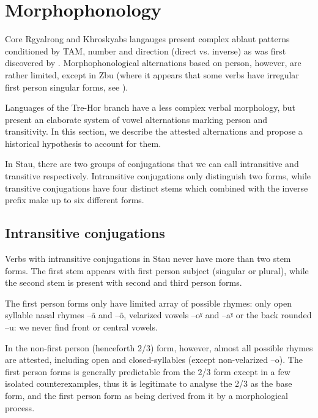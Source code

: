 \documentclass[oldfontcommands,oneside,a4paper,11pt]{article}
\newcommand{\ipa}[1]{{\phon #1}} %
\begin{document}
\section{Morphophonology}
Core Rgyalrong  and Khroskyabs langauges present complex ablaut patterns conditioned by TAM, number and direction (direct vs. inverse) as was first discovered by  \citet{jackson00sidaba}.  Morphophonological alternations based on person, however, are rather limited, except in Zbu (where it appears that some verbs have irregular first person singular forms, see \citealt{gongxun12}).

Languages of the Tre-Hor branch  have a less complex verbal morphology, but present an elaborate system of vowel alternations marking person and transitivity. In this section, we describe the attested alternations and propose a historical hypothesis to account for them.

In Stau, there are two groups of conjugations that we can call intransitive and transitive respectively. Intransitive conjugations only distinguish two forms, while transitive conjugations have four distinct stems which combined with the inverse prefix make up to six different forms.

\subsection{Intransitive conjugations}
Verbs with intransitive conjugations in Stau never have more than two stem forms. The first stem appears with first person subject (singular or plural), while the second stem is present with second and third person forms.

The first person forms only have limited array of possible rhymes: only open syllable nasal rhymes --\ipa{ã} and --\ipa{õ}, velarized vowels --\ipa{oˠ} and --\ipa{aˠ} or the back rounded --\ipa{u}: we never find front or central vowels.

In the non-first person  (henceforth 2/3)  form, however, almost all possible rhymes are attested, including open and closed-syllables (except non-velarized --\ipa{o}). The first person forms is generally predictable from the 2/3 form except in a few isolated counterexamples, thus it is legitimate to analyse the 2/3 as the base form, and the first person form as being derived from it by a morphological process.
 
\end{document}

